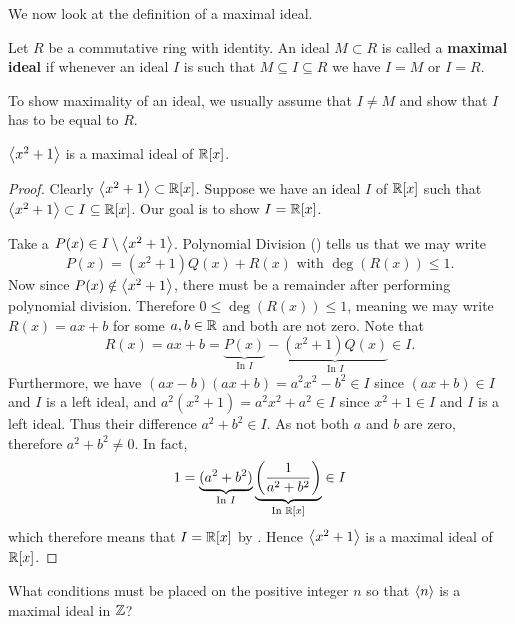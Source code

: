We now look at the definition of a maximal ideal.
\begin{definition}
    Let $R$ be a commutative ring with identity. An ideal $M \subset R$ is called a \textbf{maximal ideal} if whenever an ideal $I$ is such that $M \subseteq I \subseteq R$ we have $I = M$ or $I = R$.
\end{definition}
\begin{remark}
    To show maximality of an ideal, we usually assume that $I \neq M$ and show that $I$ has to be equal to $R$.
\end{remark}
\begin{proposition}
    $\left\langle x^2 + 1\right\rangle$ is a maximal ideal of $\mathbb{R}[x]$.
\end{proposition}
\begin{proof}
    Clearly $\left\langle x^2 + 1\right\rangle \subset \mathbb{R}[x]$. Suppose we have an ideal $I$ of $\mathbb{R}[x]$ such that $\left\langle x^2 + 1\right\rangle \subset I \subseteq \mathbb{R}[x]$. Our goal is to show $I = \mathbb{R}[x]$.

    Take a $P(x) \in I \setminus \left\langle x^2 + 1\right\rangle$. Polynomial Division () tells us that we may write
    \[
        P(x) = (x^2+1)Q(x) + R(x) \text{ with } \deg(R(x)) \leq 1.
    \]
    Now since $P(x) \notin \left\langle x^2 + 1\right\rangle$, there must be a remainder after performing polynomial division. Therefore $0 \leq \deg(R(x)) \leq 1$, meaning we may write $R(x) = ax + b$ for some $a,b \in \mathbb{R}$ and both are not zero. Note that
    \[
        R(x) = ax + b = \underbrace{P(x)}_{\text{In }I} - \underbrace{(x^2+1)Q(x)}_{\text{In }I} \in I.
    \]
    Furthermore, we have $(ax-b)(ax+b) = a^2x^2 - b^2 \in I$ since $(ax+b) \in I$ and $I$ is a left ideal, and $a^2(x^2+1) = a^2x^2 + a^2 \in I$ since $x^2+1 \in I$ and $I$ is a left ideal. Thus their difference $a^2 + b^2 \in I$. As not both $a$ and $b$ are zero, therefore $a^2 + b^2 \neq 0$. In fact,
    \[
        1 = \underbrace{(a^2+b^2)}_{\text{In }I}\underbrace{\left(\frac1{a^2+b^2}\right)}_{\text{In }\mathbb{R}[x]} \in I
    \]
    which therefore means that $I = \mathbb{R}[x]$ by . Hence $\left\langle x^2 + 1\right\rangle$ is a maximal ideal of $\mathbb{R}[x]$.
\end{proof}
\begin{exercise}
    What conditions must be placed on the positive integer $n$ so that $\left\langle n\right\rangle$ is a maximal ideal in $\mathbb{Z}$?
\end{exercise}

